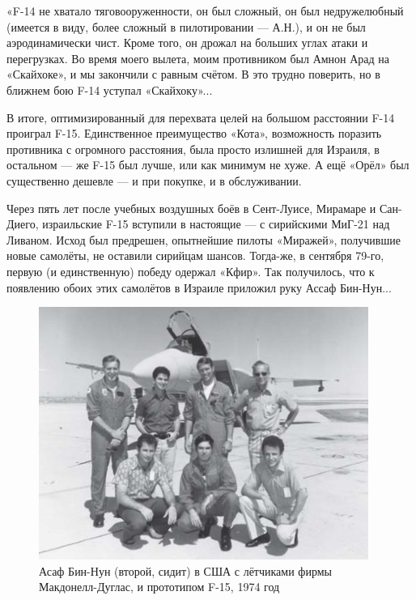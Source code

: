 «F-14 не хватало тяговооруженности, он был сложный, он был недружелюбный (имеется в виду, более сложный в пилотировании — А.Н.), и он не был аэродинамически чист. Кроме того, он дрожал на больших углах атаки и перегрузках. Во время моего вылета, моим противником был Амнон Арад на «Скайхоке», и мы закончили с равным счётом. В это трудно поверить, но в ближнем бою F-14 уступал «Скайхоку»...

В итоге, оптимизированный для перехвата целей на большом расстоянии F-14 проиграл F-15. Единственное преимущество «Кота», возможность поразить противника с огромного расстояния, была просто излишней для Израиля, в остальном — же F-15 был лучше, или как минимум не хуже. А ещё «Орёл» был существенно дешевле — и при покупке, и в обслуживании.

Через пять лет после учебных воздушных боёв в Сент-Луисе, Мирамаре и Сан-Диего, израильские F-15 вступили в настоящие — с сирийскими МиГ-21 над Ливаном. Исход был предрешен, опытнейшие пилоты «Миражей», получившие новые самолёты, не оставили сирийцам шансов. Тогда-же, в сентября 79-го, первую (и единственную) победу одержал «Кфир». Так получилось, что к появлению обоих этих самолётов в Израиле приложил руку Ассаф Бин-Нун...

\begin{figure}[h!tb] 
	\centering\includegraphics[scale=0.8]{History_BenNun/eccw4mb3YRI.jpg}
	\caption{Асаф Бин-Нун (второй, сидит) в США с лётчиками фирмы Макдонелл-Дуглас, и прототипом F-15, 1974 год}%
\end{figure}

